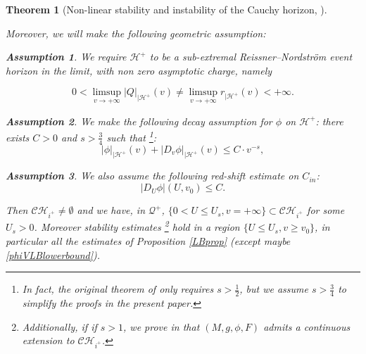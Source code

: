 \documentclass[10pt,a4paper]{article}
\theoremstyle{plain}
\newtheorem{thm}{Theorem}[section]
\theoremstyle{remark}
\theoremstyle{definition}
\newtheorem{hyp}{Assumption}
\theoremstyle{plain}
\theoremstyle{remark}
\theoremstyle{definition}
\newcommand{\CH}{\mathcal{CH}_{i^+}}
\numberwithin{equation}{section}
\begin{document}
\begin{thm}[Non-linear stability and instability of the Cauchy horizon, \cite{Moi}]
\begin{enumerate}
		
		Moreover, we will make the following geometric assumption: 
		
		\begin{hyp} \label{subexthyp}\label{hypchargeevent} We require $\mathcal{H}^+$ to be a sub-extremal  Reissner--Nordstr\"{o}m event horizon in the limit, with non zero asymptotic charge, namely 		
			
			$$ 0<  \limsup_{v \rightarrow +\infty} |Q|_{|\mathcal{H}^+}(v)  \neq  \limsup_{v \rightarrow +\infty} r_{|\mathcal{H}^+}(v) <+\infty.$$ 
			
			
		\end{hyp}
		
		
		
		\begin{hyp} \label{fieldevent}	 We make the following decay assumption for $\phi$ on $\mathcal{H}^+$: there exists $ C>0$ and $s>\frac{3}{4}$ \color{black} such that \footnote{In fact, the original theorem of \cite{Moi} only requires $s>\frac{1}{2}$, but we assume $s>\frac{3}{4}$ to simplify the proofs in the present paper. \color{black}}:
			$$|\phi|_{|\mathcal{H}^+}(v) +| D_{v} \phi|_{|\mathcal{H}^+}(v) \leq  C \cdot v^{-s},$$ %
		\end{hyp}
		
		\begin{hyp} \label{fieldUevent}  We also assume the following red-shift estimate on $C_{in}$: \label{fieldv0}
			$$| D_{U} \phi| (U, v_0) \leq C. $$ 
			
			
		\end{hyp}
		
		
		
		
		
		
		
		
		
		
		
		
		
		
		
		
		Then $\CH \neq \emptyset $ and we have, in $\mathcal{Q}^+$, $ \{ 0 < U \leq U_s, v=+\infty \} \subset \CH$ for some $U_s>0$\color{black}. Moreover stability estimates \footnote{Additionally, if if $s>1$, we prove in \cite{Moi} that $(M,g,\phi,F)$ admits a continuous extension to $\CH$.} hold in a region $\{ U \leq U_s, v\geq v_0\}$, in particular all the estimates of Proposition \ref{LBprop} (except maybe \eqref{phiVLBlowerbound}). 
		

\end{enumerate}
\end{thm}
\end{document}
